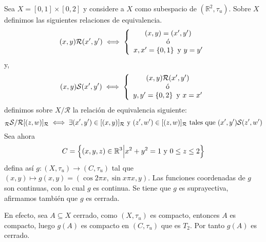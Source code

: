 \documentclass[12pt]{report}
\theoremstyle{largebreak}
\newcommand\cf[3]{\ensuremath{#1:#2\rightarrow#3}}
\begin{document}
    \begin{exa}
        Sea $X=[0,1]\times[0,2]$ y considere a $X$ como subespacio de $(\mathbb{R}^2,\tau_u)$. Sobre $X$ definimos las siguientes relaciones de equivalencia.
        \begin{equation*}
            (x,y)\mathcal{R}(x',y')\iff \left\{
                \begin{array}{c}
                    (x,y)=(x',y')\\
                    \textup{ó}\\
                    {x,x'}=\left\{0,1\right\}\textup{ y }y=y'\\
                \end{array}
            \right.
        \end{equation*}
        y,
        \begin{equation*}
            (x,y)\mathcal{S}(x',y')\iff \left\{
                \begin{array}{c}
                    (x,y)\mathcal{R}(x',y')\\
                    \textup{ó}\\
                    {y,y'}=\left\{0,2\right\}\textup{ y }x=x'\\
                \end{array}
            \right.
        \end{equation*}
        definimos sobre $X/\mathcal{R}$ la relación de equivalencia siguiente:
        \begin{equation*}
            [(x,y)]_{\mathcal{R}}\mathcal{S}/\mathcal{R}[(z,w)]_{\mathcal{R}}\iff\exists(x',y')\in[(x,y)]_{\mathcal{R}}\textup{ y }(z',w')\in[(z,w)]_{\mathcal{R}}\textup{ tales que }(x',y')\mathcal{S}(z',w')
        \end{equation*}
        Sea ahora
        \begin{equation*}
            C=\left\{(x,y,z)\in\mathbb{R}^3\Big|x^2+y^2=1\textup{ y }0\leq z\leq 2 \right\}
        \end{equation*}
        defina así $\cf{g}{(X,\tau_u)}{(C,\tau_u)}$ tal que $(x,y)\mapsto g(x,y)=(\cos 2\pi x,\sin x\pi x,y)$. Las funciones coordenadas de $g$ son continuas, con lo cual $g$ es continua. Se tiene que $g$ es suprayectiva, afirmamos también que $g$ es cerrada. 
        
        En efecto, sea $A\subseteq X$ cerrado, como $(X,\tau_u)$ es compacto, entonces $A$ es compacto, luego $g(A)$ es compacto en $(C,\tau_u)$ que es $T_2$. Por tanto $g(A)$ es cerrado.


\end{exa}
\end{document}
